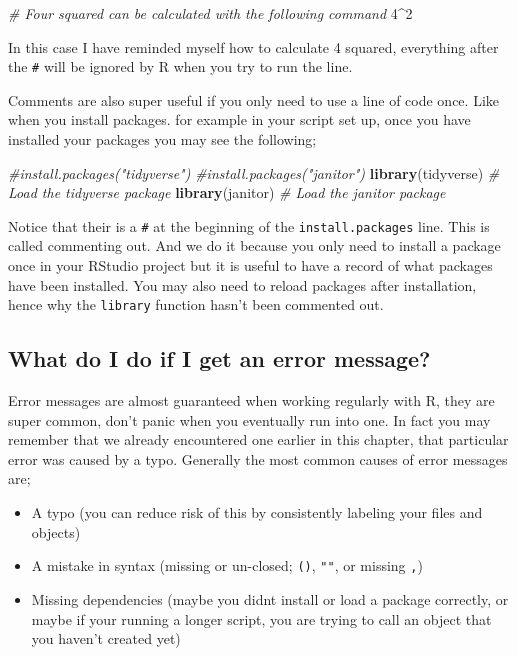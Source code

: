 \documentclass[
]{book}
\newenvironment{Shaded}{\begin{snugshade}}{\end{snugshade}}
\newcommand{\CommentTok}[1]{\textcolor[rgb]{0.56,0.35,0.01}{\textit{#1}}}
\newcommand{\DecValTok}[1]{\textcolor[rgb]{0.00,0.00,0.81}{#1}}
\newcommand{\FunctionTok}[1]{\textcolor[rgb]{0.13,0.29,0.53}{\textbf{#1}}}
\newcommand{\NormalTok}[1]{#1}
\newcommand{\SpecialCharTok}[1]{\textcolor[rgb]{0.81,0.36,0.00}{\textbf{#1}}}
\providecommand{\tightlist}{%
  \setlength{\itemsep}{0pt}\setlength{\parskip}{0pt}}
\begin{document}
\begin{Shaded}
\begin{Highlighting}[]
\CommentTok{\# Four squared can be calculated with the following command}
\DecValTok{4}\SpecialCharTok{\^{}}\DecValTok{2}
\end{Highlighting}
\end{Shaded}

In this case I have reminded myself how to calculate 4 squared, everything after the \texttt{\#} will be ignored by R when you try to run the line.

Comments are also super useful if you only need to use a line of code once. Like when you install packages. for example in your script set up, once you have installed your packages you may see the following;

\begin{Shaded}
\begin{Highlighting}[]
\CommentTok{\#install.packages("tidyverse")}
\CommentTok{\#install.packages("janitor")}
\FunctionTok{library}\NormalTok{(tidyverse) }\CommentTok{\# Load the tidyverse package}
\FunctionTok{library}\NormalTok{(janitor) }\CommentTok{\# Load the janitor package}
\end{Highlighting}
\end{Shaded}

Notice that their is a \texttt{\#} at the beginning of the \texttt{install.packages} line. This is called commenting out. And we do it because you only need to install a package once in your RStudio project but it is useful to have a record of what packages have been installed. You may also need to reload packages after installation, hence why the \texttt{library} function hasn't been commented out.

\subsection{What do I do if I get an error message?}\label{what-do-i-do-if-i-get-an-error-message}

Error messages are almost guaranteed when working regularly with R, they are super common, don't panic when you eventually run into one. In fact you may remember that we already encountered one earlier in this chapter, that particular error was caused by a typo. Generally the most common causes of error messages are;

\begin{itemize}
\tightlist
\item
  A typo (you can reduce risk of this by consistently labeling your files and objects)
\item
  A mistake in syntax (missing or un-closed; \texttt{()}, \texttt{""}, or missing \texttt{,})
\item
  Missing dependencies (maybe you didnt install or load a package correctly, or maybe if your running a longer script, you are trying to call an object that you haven't created yet)
\end{itemize}
\end{document}
